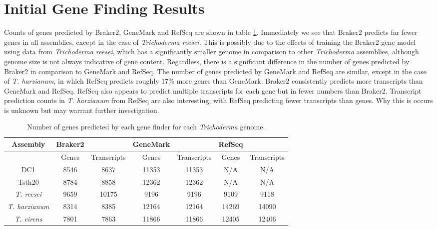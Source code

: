 \section{Initial Gene Finding Results} 
\label{section:gene-finding}

Counts of genes predicted by Braker2, GeneMark and RefSeq are shown in
table \ref{table:gene-counts}. Immediately we see that Braker2
predicts far fewer genes in all assemblies, except in the case of
\textit{Trichoderma reesei.} This is possibly due to the effects of
training the Braker2 gene model using data from \textit{Trichoderma
  reesei}, which has a significantly smaller genome in comparison to
other \textit{Trichoderma} assemblies, although genome size is not
always indicative of gene content. Regardless, there is a significant
difference in the number of genes predicted by Braker2 in comparison
to GeneMark and RefSeq. The number of genes predicted by GeneMark and
RefSeq are similar, except in the case of \textit{T. harzianum}, in
which RefSeq predicts roughly 17\% more genes than GeneMark. Braker2
consistently predicts more transcripts than GeneMark and
RefSeq. RefSeq also appears to predict multiple transcripts for each
gene but in fewer numbers than Braker2. Transcript prediction counts
in \textit{T. harzianum} from RefSeq are also interesting, with RefSeq
predicting fewer transcripts than genes. Why this is occurs is unknown
but may warrant further investigation.

\begin{table}
  \centering
  \begin{tabular}{|c|c|c|c|c|c|c|}
    \hline
    Assembly & Braker2 & & GeneMark & & RefSeq & \\ \hline
     & Genes & Transcripts & Genes & Transcripts & Genes & Transcripts \\ \hline
    DC1 & 8546 & 8637 & 11353 & 11353 & N/A & N/A \\ \hline
    Tsth20 & 8784 & 8858 & 12362 & 12362 & N/A & N/A \\ \hline
    \textit{T. reesei} & 9659 & 10175 & 9196 & 9196 & 9109 & 9118 \\ \hline
    \textit{T. harzianum} & 8314 & 8385 & 12164 & 12164 & 14269 & 14090 \\ \hline
    \textit{T. virens} & 7801 & 7863 & 11866 & 11866 & 12405 & 12406 \\ \hline
  \end{tabular}
  \caption[Gene prediction counts]{Number of genes predicted by each
    gene finder for each \textit{Trichoderma} genome.}
  \label{table:gene-counts}
\end{table}


